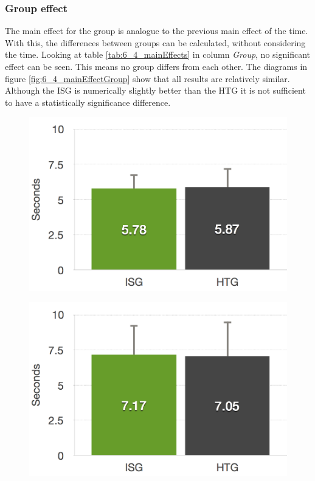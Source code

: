 \subsubsection{Group effect}
The main effect for the group is analogue to the previous main effect of the time.
With this, the differences between groups can be calculated, without considering the time.
Looking at table \ref{tab:6_4_mainEffects} in column \textit{Group}, no significant effect can be seen.
This means no group differs from each other.
The diagrams in figure \ref{fig:6_4_mainEffectGroup} show that all results are relatively similar.
Although the ISG is numerically slightly better than the HTG it is not sufficient to have a statistically significance difference.
\begin{figure}[htb]
	\centering
	\begin{minipage}[t]{0.40\linewidth}
		\centering
		\includegraphics[width=1\linewidth]{Pictures/6_4_DIA_StandLeftGroupEffect}
		\label{fig:6_4_standLeftGroupEffect}
	\end{minipage}
	\hfill
	\begin{minipage}[t]{0.40\linewidth}
		\centering
		\includegraphics[width=1\linewidth]{Pictures/6_4_DIA_StandRightGroupEffect}

\end{minipage}
\end{figure}
